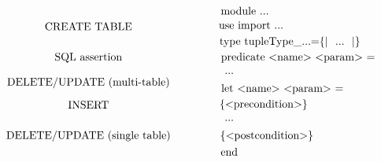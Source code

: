 \documentclass{article}
\begin{document}
\[
\begin{xy}
  (0,-5)*+{\mbox{CREATE TABLE}}="v1";
  (0,-15)*+{\mbox{SQL assertion}}="v2";
  (0,-23)*+{\mbox{DELETE/UPDATE (multi-table)}}="v3";
  (0,-30)*+{\mbox{INSERT}}="v4";
  (0,-40)*+{\mbox{DELETE/UPDATE (single table)}}="v5";
  (50,0)*+{\mbox{module ...}}="v6";
  (52,-5)*+{\mbox{use import ...}}="v7";
  (65,-10)*+{\mbox{type tupleType\_...=\{$|~~$...$~~|$\} }}="v8";
  (67,-15)*+{\mbox{predicate $<$name$>$ $<$param$>$ =}}="v9";
  (45,-20)*+{\mbox{...}}="v10";
  (62,-25)*+{\mbox{let $<$name$>$ $<$param$>$ =}}="v11";
  (56,-30)*+{\mbox{\{$<$precondition$>$\}}}="v12";
  (45,-35)*+{\mbox{...}}="v13";
  (57,-40)*+{\mbox{\{$<$postcondition$>$\}}}="v14";
  (45,-45)*+{\mbox{end}}="v15";
  {\ar@{->} "v1";"v7"};
  {\ar@{->} "v1";"v8"};
  {\ar@{->} "v2";"v9"};
  {\ar@{->} "v3";"v10"};
  {\ar@{->} "v3";"v13"};
  {\ar@{->} "v3";"v14"};
  {\ar@{->} "v4";"v13"};
  {\ar@{->} "v5";"v13"};
  {\ar@{.} "v9";(97,-15)};
  {\ar@{.} (97,-15);(97,-30)};
  {\ar@{.>} (97,-30);"v12"};
  {\ar@{.} (97,-30);(97,-40)};
  {\ar@{.>} (97,-40);"v14"};
\end{xy}
\]
\end{document}
